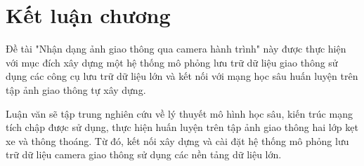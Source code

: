 \section{Kết luận chương}
Đề tài "Nhận dạng ảnh giao thông qua camera hành trình" này được thực hiện với mục đích xây dựng một hệ thống mô phỏng lưu trữ dữ liệu giao thông sử dụng các công cụ lưu trữ dữ liệu lớn và kết nối với mạng học sâu huấn luyện trên tập ảnh giao thông tự xây dựng.\par 
Luận văn sẽ tập trung nghiên cứu về lý thuyết mô hình học sâu, kiến trúc mạng tích chập được sử dụng, thực hiện huấn luyện trên tập ảnh giao thông hai lớp kẹt xe và thông thoáng. Từ đó, kết nối xây dựng và cài đặt hệ thống mô phỏng lưu trữ dữ liệu camera giao thông sử dụng các nền tảng dữ liệu lớn.


